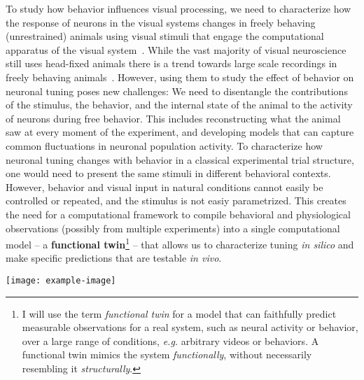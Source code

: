 \documentclass[COG,11pt]{ercgrant}
\begin{document}
To study how behavior influences visual processing, we need to characterize how the response of neurons in the visual systems changes in freely behaving (unrestrained) animals using visual stimuli that engage the computational apparatus of the visual system~\parencite{Huk2018-ez, Datta2019-qj}. 
While the vast majority of visual neuroscience still uses head-fixed animals there is a trend towards large scale recordings in freely behaving animals~\parencite{Parker2022-ac}.
However, using them to study the effect of behavior on neuronal tuning poses new challenges:
 We need to disentangle the contributions of the stimulus, the behavior, and the internal state of the animal to the activity of neurons during free behavior. 
This includes reconstructing what the animal saw at every moment of the experiment, and developing models that can capture common fluctuations in neuronal population activity.
 To characterize how neuronal tuning changes with behavior in a classical experimental trial structure, one would need to present the same stimuli in different behavioral contexts. 
However, behavior and visual input in natural conditions cannot easily be controlled or repeated, and the stimulus is not easiy parametrized.
This creates the need for a computational framework to compile behavioral and physiological observations (possibly from multiple experiments) into a single computational model -- a \textbf{functional twin}\footnote{I will use the term \textit{functional twin} for a model that can faithfully predict measurable observations for a real system, such as neural activity or behavior, over a large range of conditions, \textit{e.g.} arbitrary videos or behaviors. A functional twin mimics the system \textit{functionally}, without necessarily resembling it \textit{structurally}. } -- that allows us to characterize tuning \textit{in silico} and make specific predictions that are testable \textit{in vivo}.

\texttt{[image: example-image]}
\end{document}
